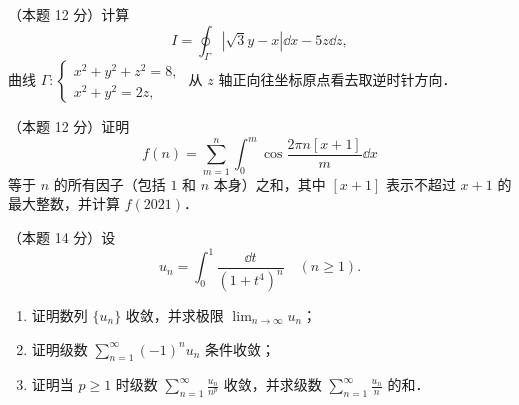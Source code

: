 \begin{problems}
\item[五、]（本题 12 分）计算
\[
  I=\oint_{\Gamma}\left|\sqrt{3}y-x\right|\dd x-5z\dd z,
\]
曲线 $\Gamma:\begin{cases}x^2+y^2+z^2=8,\\ x^2+y^2=2z,\end{cases}$ 从 $z$ 轴正向往坐标原点看去取逆时针方向．

\item[六、]（本题 12 分）证明
\[
  f(n)=\sum_{m=1}^{n}\int_0^m\cos\frac{2\pi n[x+1]}{m}\dd x
\]
等于 $n$ 的所有因子（包括 $1$ 和 $n$ 本身）之和，其中 $[x+1]$ 表示不超过 $x+1$ 的最大整数，并计算 $f(2021)$．

\item[七、]（本题 14 分）设
\[
  u_n=\int_0^1\frac{\dd t}{(1+t^4)^n}\quad(n\ge 1).
\]
\begin{enumerate}
  \item 证明数列 $\{u_n\}$ 收敛，并求极限 $\displaystyle \lim_{n\to\infty}u_n$；
  \item 证明级数 $\displaystyle \sum_{n=1}^{\infty}(-1)^nu_n$ 条件收敛；
  \item 证明当 $p\ge 1$ 时级数 $\displaystyle \sum_{n=1}^{\infty}\frac{u_n}{n^p}$ 收敛，并求级数 $\displaystyle \sum_{n=1}^{\infty}\frac{u_n}{n}$ 的和．
\end{enumerate}
\end{problems}
